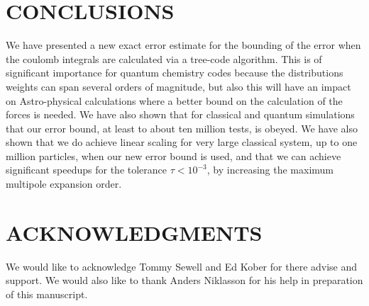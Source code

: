 \documentclass[prb,aps,nobibnotes,superbib,preprint]{revtex4}
\begin{document}
\section{CONCLUSIONS}

We have presented a new exact error estimate for the bounding of the error when the coulomb
integrals are calculated via a tree-code algorithm. This is of significant importance 
for quantum chemistry codes because the distributions 
weights can span several orders of magnitude, but also this will have an impact on Astro-physical calculations
where a better bound on the calculation of the forces is needed. We have also shown that for classical and 
quantum simulations that our error bound, at least to about ten million tests, is obeyed. 
We have also shown that we do achieve linear scaling for very large classical system, up to one million particles, 
when our new error bound is used, and that we can achieve significant speedups for the tolerance $\tau < 10^{-3}$, 
by increasing the maximum multipole expansion order. 

\section*{ACKNOWLEDGMENTS}

We would like to acknowledge Tommy Sewell and Ed Kober for there advise
and support. We would also like to thank Anders Niklasson for his help
in preparation of this manuscript. 

 



\appendix
\end{document}
